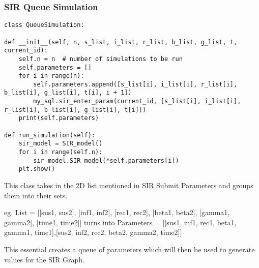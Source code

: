 \documentclass[11pt, a4paper]{article}
\begin{document}
\subsubsection{SIR Queue Simulation}
\begin{lstlisting}
class QueueSimulation:

def __init__(self, n, s_list, i_list, r_list, b_list, g_list, t, current_id):
    self.n = n  # number of simulations to be run
    self.parameters = []
    for i in range(n):
        self.parameters.append([s_list[i], i_list[i], r_list[i], b_list[i], g_list[i], t[i], i + 1])
        my_sql.sir_enter_param(current_id, [s_list[i], i_list[i], r_list[i], b_list[i], g_list[i], t[i]])
    print(self.parameters)

def run_simulation(self):
    sir_model = SIR_model()
    for i in range(self.n):
        sir_model.SIR_model(*self.parameters[i])
    plt.show()
\end{lstlisting}
This class takes in the 2D list mentioned in SIR Submit Parameters and groups them into their sets.

eg. List = [[sus1, sus2], [inf1, inf2], [rec1, rec2], [beta1, beta2], [gamma1, gamma2], [time1, time2]] turns into
Parameters = [[sus1, inf1, rec1, beta1, gamma1, time1],[sus2, inf2, rec2, beta2, gamma2, time2]]

This essential creates a queue of parameters which will then be used to generate values for the SIR Graph.
\end{document}
